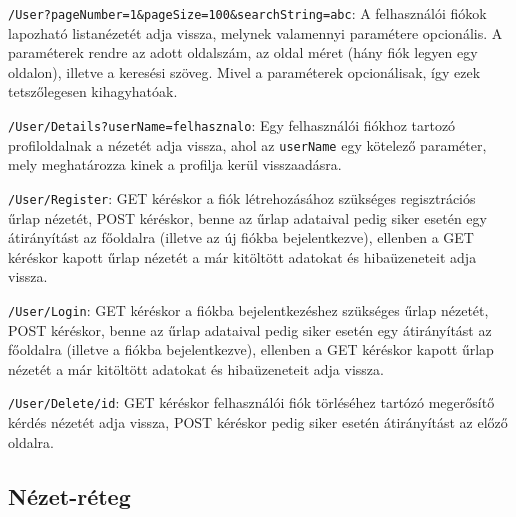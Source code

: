 \begin{compactitem}
	\item \texttt{/User?pageNumber=1\&pageSize=100\&searchString=abc}: A felhasználói fiókok lapozható listanézetét adja vissza, melynek valamennyi paramétere opcionális. A paraméterek rendre az adott oldalszám, az oldal méret (hány fiók legyen egy oldalon), illetve a keresési szöveg. Mivel a paraméterek opcionálisak, így ezek tetszőlegesen kihagyhatóak.
	\item \texttt{/User/Details?userName=felhasznalo}: Egy felhasználói fiókhoz tartozó profiloldalnak a nézetét adja vissza, ahol az \texttt{userName} egy kötelező paraméter, mely meghatározza kinek a profilja kerül visszaadásra.
	\item \texttt{/User/Register}: GET kéréskor a fiók létrehozásához szükséges regisztrációs űrlap nézetét, POST kéréskor, benne az űrlap adataival pedig siker esetén egy átirányítást az főoldalra (illetve az új fiókba bejelentkezve), ellenben a GET kéréskor kapott űrlap nézetét a már kitöltött adatokat és hibaüzeneteit adja vissza.
	\item \texttt{/User/Login}: GET kéréskor a fiókba bejelentkezéshez szükséges űrlap nézetét, POST kéréskor, benne az űrlap adataival pedig siker esetén egy átirányítást az főoldalra (illetve a fiókba bejelentkezve), ellenben a GET kéréskor kapott űrlap nézetét a már kitöltött adatokat és hibaüzeneteit adja vissza.
	\item \texttt{/User/Delete/id}: GET kéréskor felhasználói fiók törléséhez tartózó megerősítő kérdés nézetét adja vissza, POST kéréskor pedig siker esetén átirányítást az előző oldalra.
\end{compactitem}

\subsection{Nézet-réteg}

